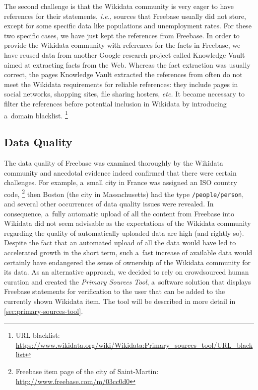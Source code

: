 \documentclass{acm_proc_article-sp}
\begin{document}
The second challenge is that the Wikidata community is very eager to have references
for their statements, \emph{i.e.}, sources that Freebase usually did not store,
except for some specific data like populations and unemployment rates.
For these two specific cases, we have just kept the references from Freebase.
In order to provide the Wikidata community with references for the facts in Freebase,
we have reused data from another Google research project
called Knowledge Vault~\cite{dong2014knowledge} aimed at extracting facts from the Web.
Whereas the fact extraction was usually correct, the pages Knowledge Vault extracted
the references from often do not meet the Wikidata requirements for reliable references:
they include pages in social networks, shopping sites, file sharing hosters, \emph{etc.}
It became necessary to filter the references before potential inclusion in Wikidata
by introducing a~domain blacklist.%
\footnote{URL blacklist:
\url{https://www.wikidata.org/wiki/Wikidata:Primary_sources_tool/URL_blacklist}}

\subsection{Data Quality}
\label{sec:dataquality}

The data quality of Freebase was examined thoroughly by the Wikidata community
and anecdotal evidence indeed confirmed that there were certain challenges.
For example, a~small city in France was assigned an ISO country code,%
\footnote{Freebase item page of the city of Saint-Martin: \url{http://www.freebase.com/m/03cc0d0}}
then Boston (the city in Massachusetts) had the type \texttt{/people/person},
and several other occurrences of data quality issues were revealed.
In consequence, a~fully automatic upload of all the content from Freebase into Wikidata
did not seem advisable as the expectations of the Wikidata community regarding the
quality of automatically uploaded data are high (and rightly so).
Despite the fact that an automated upload of all the data
would have led to accelerated growth in the short term,
such a~fast increase of available data would certainly have endangered
the sense of ownership of the Wikidata community for its data.
As an alternative approach, we decided to rely on crowdsourced human curation
and created the \emph{Primary Sources Tool},
a~software solution that displays Freebase statements
for verification to the user that can be added to the currently shown Wikidata item.
The tool will be described in more detail in \autoref{sec:primary-sources-tool}.
\end{document}
